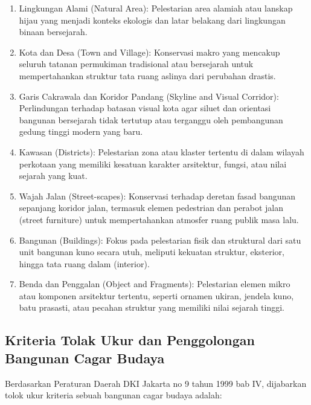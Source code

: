 \documentclass[../rumukota.tex]{subfiles}
\begin{document}
\begin{enumerate}
	\item Lingkungan Alami (Natural Area): Pelestarian area alamiah atau lanskap hijau yang menjadi konteks ekologis dan latar belakang dari lingkungan binaan bersejarah.
	\item Kota dan Desa (Town and Village): Konservasi makro yang mencakup seluruh tatanan permukiman tradisional atau bersejarah untuk mempertahankan struktur tata ruang aslinya dari perubahan drastis.
	\item Garis Cakrawala dan Koridor Pandang (Skyline and Visual Corridor): Perlindungan terhadap batasan visual kota agar siluet dan orientasi bangunan bersejarah tidak tertutup atau terganggu oleh pembangunan gedung tinggi modern yang baru.
	\item Kawasan (Districts): Pelestarian zona atau klaster tertentu di dalam wilayah perkotaan yang memiliki kesatuan karakter arsitektur, fungsi, atau nilai sejarah yang kuat.
	\item Wajah Jalan (Street-scapes): Konservasi terhadap deretan fasad bangunan sepanjang koridor jalan, termasuk elemen pedestrian dan perabot jalan (street furniture) untuk mempertahankan atmosfer ruang publik masa lalu.
	\item Bangunan (Buildings): Fokus pada pelestarian fisik dan struktural dari satu unit bangunan kuno secara utuh, meliputi kekuatan struktur, eksterior, hingga tata ruang dalam (interior).
	\item Benda dan Penggalan (Object and Fragments): Pelestarian elemen mikro atau komponen arsitektur tertentu, seperti ornamen ukiran, jendela kuno, batu prasasti, atau pecahan struktur yang memiliki nilai sejarah tinggi.
\end{enumerate}


\subsection{Kriteria Tolak Ukur dan Penggolongan Bangunan Cagar Budaya}%
\label{sub:kriteria_tolak_ukur_dan_penggolongan_bangunan_cagar_budaya}

Berdasarkan Peraturan Daerah DKI Jakarta no 9 tahun 1999 bab IV, dijabarkan tolok ukur kriteria sebuah bangunan cagar budaya adalah:
\end{document}
